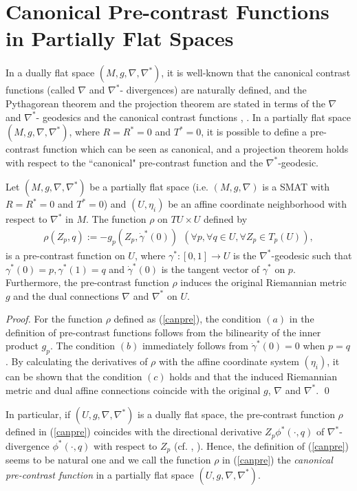 \documentclass[graybox]{svmult}
\begin{document}
\section{Canonical Pre-contrast Functions in Partially Flat Spaces}
\label{sec:4}
In a dually flat space $(M,g,\nabla,\nabla^{\ast})$, it is well-known that the canonical
contrast functions (called $\nabla$ and $\nabla^{\ast}$- divergences) are naturally
defined, and the Pythagorean theorem and the projection theorem are stated in terms of
the $\nabla$ and $\nabla^{\ast}$- geodesics and the canonical contrast functions \cite{AN},
\cite{A}.
In a partially flat space $(M,g,\nabla,\nabla^{\ast})$, where $R=R^{\ast}=0$ and
$T^{\ast}=0$, it is possible to define a pre-contrast function which can be seen as
canonical, and a projection theorem holds with respect to the ``canonical" pre-contrast
function and the $\nabla^{\ast}$-geodesic.
%
\begin{proposition}
   Let $(M,g,\nabla,\nabla^{\ast})$ be a partially flat space (i.e. $(M,g,\nabla)$
   is a SMAT with $R=R^{\ast}=0$ and $T^{\ast}=0$) and $(U,\eta_i)$ be an affine
   coordinate neighborhood with respect to $\nabla^{\ast}$ in $M$.
   The function $\rho$ on $TU \times U$ defined by
%
\begin{eqnarray}
      \rho(Z_p, q) := - g_p(Z_p, \dot{\gamma}^{\ast}(0)) \ \ 
      (\forall p, \forall q \in U, \forall Z_p \in T_p(U)), \label{canpre}
\end{eqnarray}
%
is a pre-contrast function on $U$,
where $\gamma^{\ast}:[0,1] \rightarrow U$ is the $\nabla^{\ast}$-geodesic such that
$\gamma^{\ast}(0)=p, \gamma^{\ast}(1)=q$ and $\dot{\gamma}^{\ast}(0)$ is the tangent
vector of $\gamma^{\ast}$ on $p$.
Furthermore, the pre-contrast function $\rho$ induces the original Riemannian metric
$g$ and the dual connections $\nabla$ and $\nabla^{\ast}$ on $U$.
\end{proposition}
%
\begin{proof}%
   For the function $\rho$ defined as (\ref{canpre}), the condition $(a)$ in the definition
   of pre-contrast functions follows from the bilinearity of the inner product $g_p$.
   The condition $(b)$ immediately follows from $\dot{\gamma}^{\ast}(0)=0$ when $p=q$.
   By calculating the derivatives of $\rho$ with the affine coordinate system $(\eta_i)$,
   it can be shown that the condition $(c)$ holds and that the induced Riemannian metric
   and dual affine connections coincide with the original $g$, $\nabla$ and $\nabla^{\ast}$.
   \qed
\end{proof}
%
In particular, if $(U,g,\nabla,\nabla^{\ast})$ is a dually flat space, the pre-contrast
function $\rho$ defined in (\ref{canpre}) coincides with the directional derivative
$Z_p\phi^{\ast}(\cdot,q)$ of $\nabla^{\ast}$-divergence $\phi^{\ast}(\cdot,q)$ with
respect to $Z_p$ (cf. \cite{HK}, \cite{AA}).
Hence, the definition of (\ref{canpre}) seems to be natural one and we call the function
$\rho$ in (\ref{canpre}) the {\em canonical pre-contrast function} in a partially flat
space $(U,g,\nabla,\nabla^{\ast})$.
\end{document}
